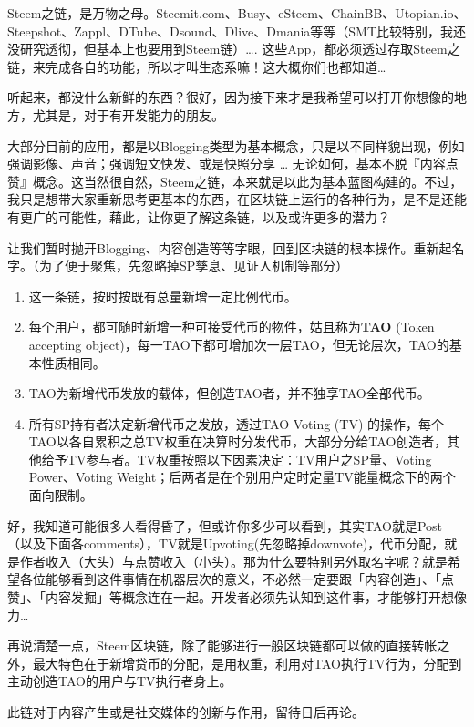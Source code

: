 \documentclass[]{ctexbook}
\providecommand{\tightlist}{%
  \setlength{\itemsep}{0pt}\setlength{\parskip}{0pt}}
\begin{document}
Steem之链，是万物之母。Steemit.com、Busy、eSteem、ChainBB、Utopian.io、Steepshot、Zappl、DTube、Dsound、Dlive、Dmania等等（SMT比较特别，我还没研究透彻，但基本上也要用到Steem链）\ldots{}. 这些App，都必须透过存取Steem之链，来完成各自的功能，所以才叫生态系嘛！这大概你们也都知道\ldots{}

听起来，都没什么新鲜的东西？很好，因为接下来才是我希望可以打开你想像的地方，尤其是，对于有开发能力的朋友。

大部分目前的应用，都是以Blogging类型为基本概念，只是以不同样貌出现，例如强调影像、声音；强调短文快发、或是快照分享 \ldots{} 无论如何，基本不脱『内容点赞』概念。这当然很自然，Steem之链，本来就是以此为基本蓝图构建的。不过，我只是想带大家重新思考更基本的东西，在区块链上运行的各种行为，是不是还能有更广的可能性，藉此，让你更了解这条链，以及或许更多的潜力？

让我们暂时抛开Blogging、内容创造等等字眼，回到区块链的根本操作。重新起名字。（为了便于聚焦，先忽略掉SP孳息、见证人机制等部分）

\begin{enumerate}
\def\labelenumi{\arabic{enumi}.}
\tightlist
\item
  这一条链，按时按既有总量新增一定比例代币。
\item
  每个用户，都可随时新增一种可接受代币的物件，姑且称为\textbf{TAO} (Token accepting object)，每一TAO下都可增加次一层TAO，但无论层次，TAO的基本性质相同。
\item
  TAO为新增代币发放的载体，但创造TAO者，并不独享TAO全部代币。
\item
  所有SP持有者决定新增代币之发放，透过TAO Voting (TV) 的操作，每个TAO以各自累积之总TV权重在决算时分发代币，大部分分给TAO创造者，其他给予TV参与者。TV权重按照以下因素决定：TV用户之SP量、Voting Power、Voting Weight；后两者是在个别用户定时定量TV能量概念下的两个面向限制。
\end{enumerate}

好，我知道可能很多人看得昏了，但或许你多少可以看到，其实TAO就是Post（以及下面各comments），TV就是Upvoting(先忽略掉downvote)，代币分配，就是作者收入（大头）与点赞收入（小头）。那为什么要特别另外取名字呢？就是希望各位能够看到这件事情在机器层次的意义，不必然一定要跟「内容创造」、「点赞」、「内容发掘」等概念连在一起。开发者必须先认知到这件事，才能够打开想像力\ldots{}

再说清楚一点，Steem区块链，除了能够进行一般区块链都可以做的直接转帐之外，最大特色在于新增贷币的分配，是用权重，利用对TAO执行TV行为，分配到主动创造TAO的用户与TV执行者身上。

此链对于内容产生或是社交媒体的创新与作用，留待日后再论。
\end{document}
